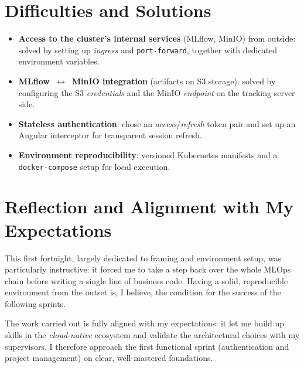 \documentclass[11pt,a4paper]{article}
\begin{document}
\section{Difficulties and Solutions}
\begin{itemize}[leftmargin=1.4em,itemsep=3pt]
  \item \textbf{Access to the cluster's internal services} (MLflow, MinIO) from
        outside: solved by setting up \emph{ingress} and \texttt{port-forward},
        together with dedicated environment variables.
  \item \textbf{MLflow~$\leftrightarrow$~MinIO integration} (artifacts on S3
        storage): solved by configuring the S3 \emph{credentials} and the MinIO
        \emph{endpoint} on the tracking server side.
  \item \textbf{Stateless authentication}: chose an \emph{access}/\emph{refresh}
        token pair and set up an Angular interceptor for transparent session
        refresh.
  \item \textbf{Environment reproducibility}: versioned Kubernetes manifests and a
        \texttt{docker-compose} setup for local execution.
\end{itemize}

\section{Reflection and Alignment with My Expectations}
This first fortnight, largely dedicated to framing and environment setup, was
particularly instructive: it forced me to take a step back over the whole MLOps
chain before writing a single line of business code. Having a solid, reproducible
environment from the outset is, I believe, the condition for the success of the
following sprints.

The work carried out is fully aligned with my expectations: it let me build up
skills in the \emph{cloud-native} ecosystem and validate the architectural choices
with my supervisors. I therefore approach the first functional sprint
(authentication and project management) on clear, well-mastered foundations.
\end{document}
